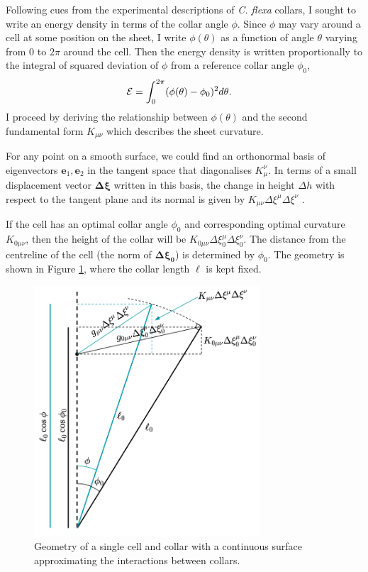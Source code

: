 Following cues from the experimental descriptions of \textit{C. flexa} collars, I sought to write an energy density in terms of the collar angle $\phi$. 
Since $\phi$ may vary around a cell at some position on the sheet, I write $\phi(\theta)$ as a function of angle $\theta$ varying from $0$ to $2\pi$ around the cell.
Then the energy density is written proportionally to the integral of squared deviation of $\phi$ from a reference collar angle $\phi_0$,
\begin{align}
	\mathcal{E} &= \int_0^{2\pi} (\phi(\theta) - \phi_0)^2 d\theta. \label{eq:phi_int}
\end{align}
I proceed by deriving the relationship between $\phi(\theta)$ and the second fundamental form $K_{\mu\nu}$ which describes the sheet curvature.

For any point on a smooth surface, we could find an orthonormal basis of eigenvectors $\bm{e}_1, \bm{e}_2$ in the tangent space that diagonalises $K_\mu^\nu$. 
In terms of a small displacement vector $\bm{\Delta \xi}$ written in this basis, the change in height $\Delta h$ with respect to the tangent plane and its normal is given by $K_{\mu\nu}\Delta\xi^\mu\Delta\xi^\nu$ \citep{powers2010}.

If the cell has an optimal collar angle $\phi_0$ and corresponding optimal curvature $K_{0\mu\nu}$, then the height of the collar will be $K_{0\mu\nu}\Delta\xi_0^\mu\Delta\xi_0^\nu$. 
The distance from the centreline of the cell (the norm of $\bm{\Delta\xi_0}$) is determined by $\phi_0$. The geometry is shown in Figure \ref{fig:geom}, where the collar length $\ell$ is kept fixed.

\begin{figure}[htbp]
    \centering
    \includegraphics[width=0.75\textwidth]{geom.png}
    \caption[Geometry for continuous approximation of \textit{C. flexa} sheets]{Geometry of a single cell and collar with a continuous surface approximating the interactions between collars.}
    \label{fig:geom}
\end{figure}

